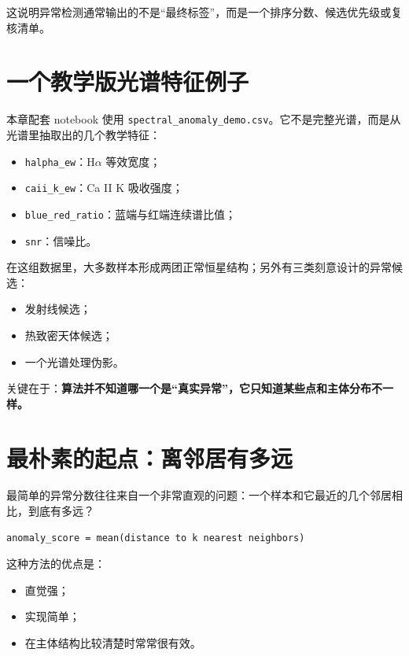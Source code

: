 这说明异常检测通常输出的不是“最终标签”，而是一个排序分数、候选优先级或复核清单。

\section{一个教学版光谱特征例子}

本章配套 notebook 使用 \nolinkurl{spectral_anomaly_demo.csv}。它不是完整光谱，而是从光谱里抽取出的几个教学特征：

\begin{itemize}
    \item \texttt{halpha\_ew}：H$\alpha$ 等效宽度；
    \item \texttt{caii\_k\_ew}：Ca II K 吸收强度；
    \item \texttt{blue\_red\_ratio}：蓝端与红端连续谱比值；
    \item \texttt{snr}：信噪比。
\end{itemize}

在这组数据里，大多数样本形成两团正常恒星结构；另外有三类刻意设计的异常候选：

\begin{itemize}
    \item 发射线候选；
    \item 热致密天体候选；
    \item 一个光谱处理伪影。
\end{itemize}

关键在于：\textbf{算法并不知道哪一个是“真实异常”，它只知道某些点和主体分布不一样。}

\section{最朴素的起点：离邻居有多远}

最简单的异常分数往往来自一个非常直观的问题：一个样本和它最近的几个邻居相比，到底有多远？

\begin{examplebox}[距离型异常分数]
\begin{lstlisting}[style=pythonstyle]
anomaly_score = mean(distance to k nearest neighbors)
\end{lstlisting}
\end{examplebox}

这种方法的优点是：

\begin{itemize}
    \item 直觉强；
    \item 实现简单；
    \item 在主体结构比较清楚时常常很有效。
\end{itemize}

